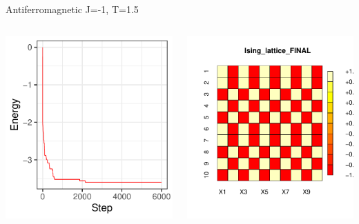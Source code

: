 \documentclass{beamer}
\begin{document}
\begin{frame}{Antiferromagnetic J=-1, T=1.5}
\begin{columns}
\begin{column}{0.5\textwidth}
    \begin{center}
     \includegraphics[width=\textwidth]{Pic/J-1_60_2500_T=1.5_ENERGY.pdf}
     \end{center}
\end{column}
\begin{column}{0.5\textwidth}
    \begin{center}
     \includegraphics[width=\textwidth]{Pic/J-1_60_2500_T=1.5_FINAL.pdf}

\end{center}
\end{column}
\end{columns}
\end{frame}
\end{document}
